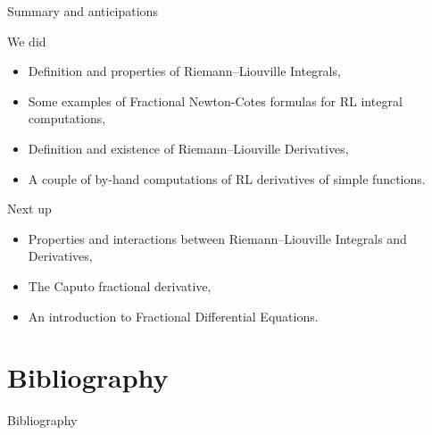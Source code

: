 \documentclass[aspectratio=169,xcolor=dvipsnames]{beamer}
\newcommand\unnumbered{\setbeamertemplate{footline}{}\addtocounter{framenumber}{-1}}
\begin{document}
\begin{frame}{Summary and anticipations}

We did
\begin{itemize}
	\item[\textcolor{success}{\faCheckCircle}] Definition and properties of Riemann--Liouville Integrals,
	\item[\textcolor{success}{\faCheckCircle}] Some examples of Fractional Newton-Cotes formulas for RL integral computations,
	\item[\textcolor{success}{\faCheckCircle}] Definition and  existence of Riemann--Liouville Derivatives,
	\item[\textcolor{success}{\faCheckCircle}] A couple of by-hand computations of RL derivatives of simple functions.
\end{itemize}

Next up
\begin{itemize}
	\item[\textcolor{todo}{\faClipboardList}] Properties and interactions between Riemann--Liouville Integrals and Derivatives,
	\item[\textcolor{todo}{\faClipboardList}] The Caputo fractional derivative,
	\item[\textcolor{todo}{\faClipboardList}] An introduction to Fractional Differential Equations.
\end{itemize}

\end{frame}

\appendix

\section*{Bibliography}
{\unnumbered
\begin{frame}[allowframebreaks]{Bibliography}
\small
\printbibliography

\end{frame}
}
\end{document}
